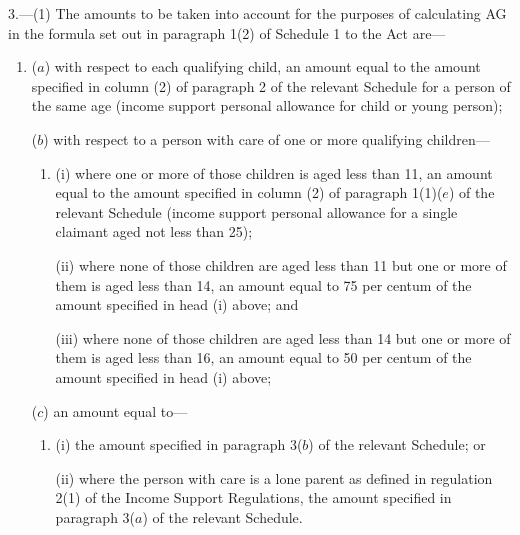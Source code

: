 \documentclass[12pt,a4paper]{article}
\begin{document}
3.—(1) The amounts to be taken into account for the purposes of calculating AG in the formula set out in paragraph 1(2) of Schedule 1 to the Act are—
\begin{enumerate}\item[]
($a$) with respect to each qualifying child, an amount equal to the amount specified in column (2) of paragraph 2 of the relevant Schedule for a person of the same age (income support personal allowance for child or young person);


($b$) with respect to a person with care of one or more qualifying children—
\begin{enumerate}\item[]
(i) where one or more of those children is aged less than 11, an amount equal to the amount specified in column (2) of paragraph 1(1)($e$) of the relevant Schedule (income support personal allowance for a single claimant aged not less than 25);

(ii) where none of those children are aged less than 11 but one or more of them is aged less than 14, an amount equal to 75 per centum of the amount specified in head (i) above; and

(iii) where none of those children are aged less than 14 but one or more of them is aged less than 16, an amount equal to 50 per centum of the amount specified in head (i) above;
\end{enumerate} %


($c$) an amount equal to—
\begin{enumerate}\item[]
(i) the amount specified in paragraph 3($b$) of the relevant Schedule; or

(ii) where the person with care is a lone parent as defined in regulation 2(1) of the Income Support Regulations, the amount specified in paragraph 3($a$) of the relevant Schedule.
\end{enumerate}

\end{enumerate}
\end{document}
